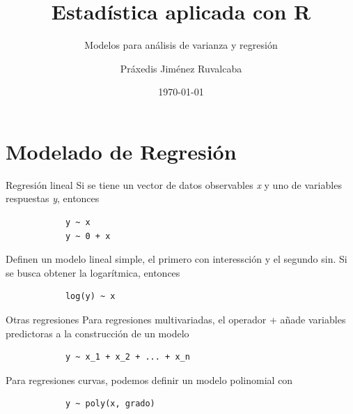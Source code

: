 \documentclass[aspectratio=169,xcolor=dvipsnames]{beamer}
\title{Estadística aplicada con R}
\subtitle{Modelos para análisis de varianza y regresión}
\author{Práxedis Jiménez Ruvalcaba}
\institute
{

}
\date{\today}
\begin{document}
\begin{frame}[c]

    \vspace{1cm}
    \begin{center}
        \insertauthor\par
        \vspace{0.5cm}
        \insertinstitute\par
        \insertdate
    \end{center}
    
\end{frame}

\section{Modelado de Regresión}
    \begin{frame}[fragile]{Regresión lineal}
        Si se tiene un vector de datos observables \textit{x} y uno de variables respuestas \textit{y}, entonces
        \begin{verbatim}
            y ~ x
            y ~ 0 + x
        \end{verbatim}
        Definen un modelo lineal simple, el primero con interessción y el segundo sin. Si se busca 
        obtener la logarítmica, entonces
        \begin{verbatim}
            log(y) ~ x
        \end{verbatim}
    \end{frame}

    \begin{frame}[fragile]{Otras regresiones}
        Para regresiones multivariadas, el operador + añade variables predictoras a la construcción de un modelo
        \begin{verbatim}
            y ~ x_1 + x_2 + ... + x_n
        \end{verbatim}
        Para regresiones curvas, podemos definir un modelo polinomial con
        \begin{verbatim}
            y ~ poly(x, grado)
        \end{verbatim}
    \end{frame}
\end{document}
